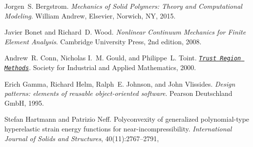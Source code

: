 
\begin{DoxyDescription}
\item[\label{a03033_CITEREF_bergstromMechanicsSolidPolymers2015}%
\Hypertarget{a03033_CITEREF_bergstromMechanicsSolidPolymers2015}%
\mbox{[}1\mbox{]}]Jorgen~S. Bergstrom. {\itshape Mechanics of Solid Polymers\+: Theory and Computational Modeling}. William Andrew, Elsevier, Norwich, NY, 2015.


\item[\label{a03033_CITEREF_bonet2008nonlinear}%
\Hypertarget{a03033_CITEREF_bonet2008nonlinear}%
\mbox{[}2\mbox{]}]Javier Bonet and Richard~D. Wood. {\itshape Nonlinear Continuum Mechanics for Finite Element Analysis}. Cambridge University Press, 2nd edition, 2008. 


\item[\label{a03033_CITEREF_trustregion}%
\Hypertarget{a03033_CITEREF_trustregion}%
\mbox{[}3\mbox{]}]Andrew~R. Conn, Nicholas I.~M. Gould, and Philippe~L. Toint. \href{https://epubs.siam.org/doi/abs/10.1137/1.9780898719857}{\texttt{ {\itshape Trust Region Methods}}}. Society for Industrial and Applied Mathematics, 2000. 


\item[\label{a03033_CITEREF_gamma1995design}%
\Hypertarget{a03033_CITEREF_gamma1995design}%
\mbox{[}4\mbox{]}]Erich Gamma, Richard Helm, Ralph~E. Johnson, and John Vlissides. {\itshape Design patterns\+: elements of reusable object-\/oriented software}. Pearson Deutschland GmbH, 1995.


\item[\label{a03033_CITEREF_hartmann_polyconvexity_2003}%
\Hypertarget{a03033_CITEREF_hartmann_polyconvexity_2003}%
\mbox{[}5\mbox{]}]Stefan Hartmann and Patrizio Neff. Polyconvexity of generalized polynomial-\/type hyperelastic strain energy functions for near-\/incompressibility. {\itshape International Journal of Solids and Structures}, 40(11)\+:2767--2791,
\begin{DoxyEnumerate}
\item 
\end{DoxyEnumerate}


\end{DoxyDescription}